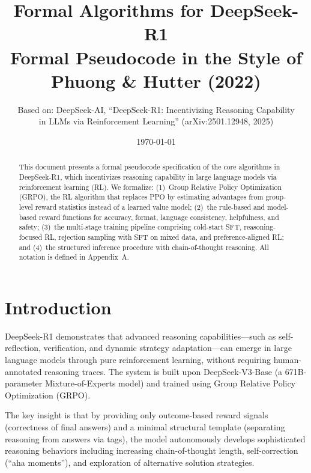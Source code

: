 \documentclass[11pt,a4paper]{article}
\title{\textbf{Formal Algorithms for DeepSeek-R1} \\[0.5em]
  \large Formal Pseudocode in the Style of Phuong \& Hutter (2022)}
\author{Based on: DeepSeek-AI, ``DeepSeek-R1: Incentivizing Reasoning Capability \\
in LLMs via Reinforcement Learning'' (arXiv:2501.12948, 2025)}
\date{\today}
\begin{document}
\maketitle

\begin{abstract}
This document presents a formal pseudocode specification of the core algorithms in DeepSeek-R1, which incentivizes reasoning capability in large language models via reinforcement learning (RL). We formalize: (1)~Group Relative Policy Optimization (GRPO), the RL algorithm that replaces PPO by estimating advantages from group-level reward statistics instead of a learned value model; (2)~the rule-based and model-based reward functions for accuracy, format, language consistency, helpfulness, and safety; (3)~the multi-stage training pipeline comprising cold-start SFT, reasoning-focused RL, rejection sampling with SFT on mixed data, and preference-aligned RL; and (4)~the structured inference procedure with chain-of-thought reasoning. All notation is defined in Appendix~A.
\end{abstract}

\tableofcontents
\newpage

\section{Introduction}

DeepSeek-R1 demonstrates that advanced reasoning capabilities---such as self-reflection, verification, and dynamic strategy adaptation---can emerge in large language models through pure reinforcement learning, without requiring human-annotated reasoning traces. The system is built upon DeepSeek-V3-Base (a 671B-parameter Mixture-of-Experts model) and trained using Group Relative Policy Optimization (GRPO).

The key insight is that by providing only outcome-based reward signals (correctness of final answers) and a minimal structural template (separating reasoning from answers via tags), the model autonomously develops sophisticated reasoning behaviors including increasing chain-of-thought length, self-correction (``aha moments''), and exploration of alternative solution strategies.
\end{document}
